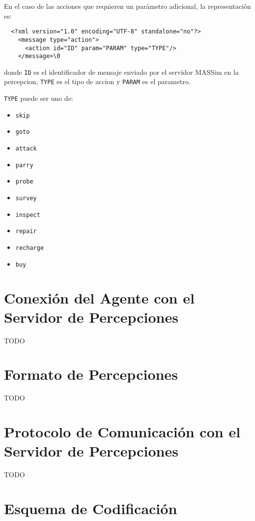   En el caso de las acciones que requieren un parámetro adicional, la
  representación es:
  
  \begin{verbatim}
  <?xml version="1.0" encoding="UTF-8" standalone="no"?>
    <message type="action">
      <action id="ID" param="PARAM" type="TYPE"/>
    </message>\0
  \end{verbatim}
  
  donde {\tt ID} es el identificador de mensaje enviado por el servidor
  MASSim en la percepcion, {\tt TYPE} es el tipo de accion y {\tt PARAM}
  es el parametro. 
  
  {\tt TYPE} puede ser uno de:
  
  \begin{itemize}
  \item \tt{skip}
  \item \tt{goto}
  \item \tt{attack}
  \item \tt{parry}
  \item \tt{probe}
  \item \tt{survey}
  \item \tt{inspect}
  \item \tt{repair}
  \item \tt{recharge}
  \item \tt{buy}
  \end{itemize}

\section{Conexión del Agente con el Servidor de Percepciones}

TODO

\section{Formato de Percepciones}

TODO

\section{Protocolo de Comunicación con el Servidor de Percepciones}

TODO

\section{Esquema de Codificación}

